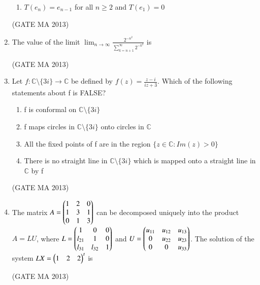 \documentclass[journal,12pt,onecolumn]{IEEEtran}
\theoremstyle{remark}
\begin{document}
\begin{enumerate}
\begin{enumerate}
        \item $T(e_n) = e_{n-1}$ for all $n \ge 2$ and $T(e_1) = 0$
    \end{enumerate}
    \hfill (GATE MA 2013)
    \item The value of the limit $\lim_{n \to \infty} \frac{2^{-n^2}}{\sum_{k=n+1}^{\infty} 2^{-k^2}}$ is
    \begin{enumerate}
    \end{enumerate}
    \hfill (GATE MA 2013)
    \item Let $f: \mathbb{C} \setminus \{3i\} \rightarrow \mathbb{C}$ be defined by $f(z) = \frac{z-i}{iz+3}$. Which of the following statements about f is FALSE?
    \begin{enumerate}
        \item f is conformal on $\mathbb{C} \setminus \{3i\}$
        \item f maps circles in $\mathbb{C} \setminus \{3i\}$ onto circles in $\mathbb{C}$
        \item All the fixed points of f are in the region $\{z \in \mathbb{C} : Im(z) > 0\}$
        \item There is no straight line in $\mathbb{C} \setminus \{3i\}$ which is mapped onto a straight line in $\mathbb{C}$ by f
    \end{enumerate}
    \hfill (GATE MA 2013)
    \item The matrix $A = \begin{pmatrix} 1 & 2 & 0 \\ 1 & 3 & 1 \\ 0 & 1 & 3 \end{pmatrix}$ can be decomposed uniquely into the product $A=LU$, where $L = \begin{pmatrix} 1 & 0 & 0 \\ l_{21} & 1 & 0 \\ l_{31} & l_{32} & 1 \end{pmatrix}$ and $U = \begin{pmatrix} u_{11} & u_{12} & u_{13} \\ 0 & u_{22} & u_{23} \\ 0 & 0 & u_{33} \end{pmatrix}$. The solution of the system $LX = \begin{pmatrix}1 & 2 & 2\end{pmatrix}^t$ is
    \begin{enumerate}
    \end{enumerate}
    \hfill (GATE MA 2013)
    

\end{enumerate}
\end{document}
